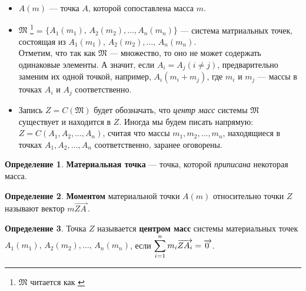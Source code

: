 \documentclass[14pt]{extarticle}
\let\Overrightarrow\overrightarrow
\let\vecarrow\overrightarrow
\theoremstyle{definition}
\newtheorem*{definition}{Определение}
\theoremstyle{theorem}
\begin{document}
\begin{itemize}[leftmargin=*]

\item \(A(m)\) --- точка \(A\), которой сопоставлена масса \(m\).

\item \(\mathfrak{M}\) 
\footnote{{\fontsize{12}{12} \(\mathfrak{M}\) 
\textup{читается как \textit{}}}}
= \(\big\{A_1(m_1), \, A_2(m_2), \dots , A_n(m_n) \big\}\) --- 
система матриальных точек,
состоящая из \(A_1(m_1), \, A_2(m_2), \dots , \, A_n(m_n)\).\\
Отметим, что так как \(\mathfrak{M}\) --- множество, то оно не
может содержать одинаковые элементы. А значит, если 
\(A_i = A_j (i \neq j)\), предварительно заменим их одной точкой,
например, \(A_i(m_i + m_j)\), где \(m_i\) и \(m_j\) --- 
массы в точках \(A_i\) и \(A_j\) соответственно. 

\item Запись \(Z = C(\mathfrak{M})\) будет обозначать, что 
\textit{центр масс} системы \(\mathfrak{M}\) существует и находится в \(Z\).
Иногда мы будем писать напрямую: \(Z = C(A_1, A_2, \dots , A_n)\), 
считая что массы \(m_1, m_2, \dots , m_n\), находящиеся в точках 
\(A_1, A_2, \dots , A_n\) соответственно, заранее оговорены.


\end{itemize}


\begin{definition}
\noindent \textbf{Материальная точка} --- точка, которой 
\textit{приписана} некоторая масса.
\end{definition}

\begin{definition}
\noindent \textbf{Моментом} материальной точки $A(m)$ относительно 
точки $Z$ называют вектор $m \Overrightarrow{ZA_{\,}}$.
\end{definition}

\begin{definition}
\vspace{-3mm}
{
\noindent Точка $Z$ называется \textbf{центром масс} системы материальных 
точек $A_1(m_1), \, A_2(m_2), \dots , \, A_n(m_n)$, 
если $\mathlarger{\sum_{i=1}^{n} m_i \Overrightarrow{ZA_i} = \vecarrow{0_{\,}}}$.
\par}
\vspace{3mm}
\end{definition}
\end{document}
